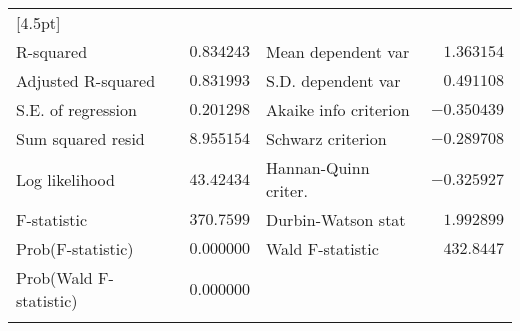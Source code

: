 \begin{tabular}{lrrrr}
[4.5pt] \hline \\ [-4.5pt]
\multicolumn{1}{l}{R-squared}&\multicolumn{1}{r}{$0.834243$}&\multicolumn{2}{l}{Mean dependent var}&\multicolumn{1}{r}{$1.363154$}\\
\multicolumn{1}{l}{Adjusted R-squared}&\multicolumn{1}{r}{$0.831993$}&\multicolumn{2}{l}{S.D. dependent var}&\multicolumn{1}{r}{$0.491108$}\\
\multicolumn{1}{l}{S.E. of regression}&\multicolumn{1}{r}{$0.201298$}&\multicolumn{2}{l}{Akaike info criterion}&\multicolumn{1}{r}{$-0.350439$}\\
\multicolumn{1}{l}{Sum squared resid}&\multicolumn{1}{r}{$8.955154$}&\multicolumn{2}{l}{Schwarz criterion}&\multicolumn{1}{r}{$-0.289708$}\\
\multicolumn{1}{l}{Log likelihood}&\multicolumn{1}{r}{$43.42434$}&\multicolumn{2}{l}{Hannan-Quinn criter.}&\multicolumn{1}{r}{$-0.325927$}\\
\multicolumn{1}{l}{F-statistic}&\multicolumn{1}{r}{$370.7599$}&\multicolumn{2}{l}{Durbin-Watson stat}&\multicolumn{1}{r}{$1.992899$}\\
\multicolumn{1}{l}{Prob(F-statistic)}&\multicolumn{1}{r}{$0.000000$}&\multicolumn{2}{l}{Wald F-statistic}&\multicolumn{1}{r}{$432.8447$}\\
\multicolumn{1}{l}{Prob(Wald F-statistic)}&\multicolumn{1}{r}{$0.000000$}&\multicolumn{1}{c}{}&\multicolumn{1}{c}{}&\multicolumn{1}{c}{}\\
[4.5pt] \hline \\ [-4.5pt]
\end{tabular}
